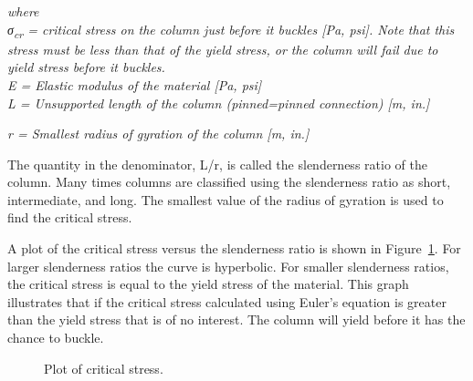 \documentclass[
  letterpaper,
  DIV=11,
  numbers=noendperiod]{scrreprt}
\theoremstyle{definition}
\theoremstyle{remark}
\begin{document}
\emph{where}\\
\emph{σ\textsubscript{cr} = critical stress on the column just before it
buckles {[}Pa, psi{]}. Note that this stress must be less than that of
the yield stress, or the column will fail due to yield stress before it
buckles.}\\
\emph{E = Elastic modulus of the material {[}Pa, psi{]}}\\
\emph{L = Unsupported length of the column (pinned=pinned connection)
{[}m, in.{]}}

\emph{r = Smallest radius of gyration of the column {[}m, in.{]}}

The quantity in the denominator, L/r, is called the slenderness ratio of
the column. Many times columns are classified using the slenderness
ratio as short, intermediate, and long. The smallest value of the radius
of gyration is used to find the critical stress.

A plot of the critical stress versus the slenderness ratio is shown in
Figure~\ref{fig-15.7}. For larger slenderness ratios the curve is
hyperbolic. For smaller slenderness ratios, the critical stress is equal
to the yield stress of the material. This graph illustrates that if the
critical stress calculated using Euler's equation is greater than the
yield stress that is of no interest. The column will yield before it has
the chance to buckle.

\begin{figure}


\caption{\label{fig-15.7}Plot of critical stress.}

\end{figure}%
\end{document}
